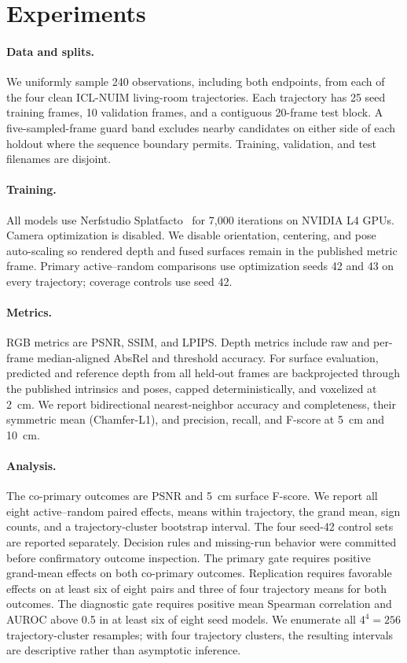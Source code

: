 \section{Experiments}

\paragraph{Data and splits.}
We uniformly sample 240 observations, including both endpoints, from each of
the four clean ICL-NUIM living-room trajectories.  Each trajectory has 25 seed
training frames, 10 validation frames, and a contiguous 20-frame test block.
A five-sampled-frame guard band excludes nearby candidates on either side of
each holdout where the sequence boundary permits.  Training, validation, and
test filenames are disjoint.

\paragraph{Training.}
All models use Nerfstudio Splatfacto~\cite{tancik2023nerfstudio} for 7,000
iterations on NVIDIA L4 GPUs.
Camera optimization is disabled.  We disable orientation, centering, and pose
auto-scaling so rendered depth and fused surfaces remain in the published
metric frame.  Primary active--random comparisons use optimization seeds 42
and 43 on every trajectory; coverage controls use seed 42.

\paragraph{Metrics.}
RGB metrics are PSNR, SSIM, and LPIPS.  Depth metrics include raw and per-frame
median-aligned AbsRel and threshold accuracy.  For surface evaluation, predicted
and reference depth from all held-out frames are backprojected through the
published intrinsics and poses, capped deterministically, and voxelized at
\SI{2}{cm}.  We report bidirectional nearest-neighbor accuracy and completeness,
their symmetric mean (Chamfer-L1), and precision, recall, and F-score at
\SI{5}{cm} and \SI{10}{cm}.

\paragraph{Analysis.}
The co-primary outcomes are PSNR and \SI{5}{cm} surface F-score.  We report all
eight active--random paired effects, means within trajectory, the grand mean,
sign counts, and a trajectory-cluster bootstrap interval.  The four seed-42
control sets are reported separately.  Decision rules and missing-run behavior
were committed before confirmatory outcome inspection.  The primary gate
requires positive grand-mean effects on both co-primary outcomes.  Replication
requires favorable effects on at least six of eight pairs and three of four
trajectory means for both outcomes.  The diagnostic gate requires positive
mean Spearman correlation and AUROC above 0.5 in at least six of eight seed
models.  We enumerate all $4^4=256$ trajectory-cluster resamples; with four
trajectory clusters, the resulting intervals are descriptive rather than
asymptotic inference.

